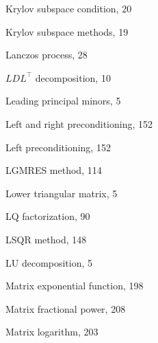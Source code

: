 \begin{description}
{Krylov subspace condition}, {20}\par

{Krylov subspace methods}, {19}\par

\item[L]
{Lanczos process}, {28}\par

{$LDL^{\top}$ decomposition}, {10}\par

{Leading principal minors}, {5}\par

{Left and right preconditioning}, {152}\par

{Left preconditioning}, {152}\par

{LGMRES method}, {114}\par

{Lower triangular matrix}, {5}\par

{LQ factorization}, {90}\par

{LSQR method}, {148}\par

{LU decomposition}, {5}\par

\item[M]
{Matrix exponential function}, {198}\par

{Matrix fractional power}, {208}\par

{Matrix logarithm}, {203}\par


\end{description}
